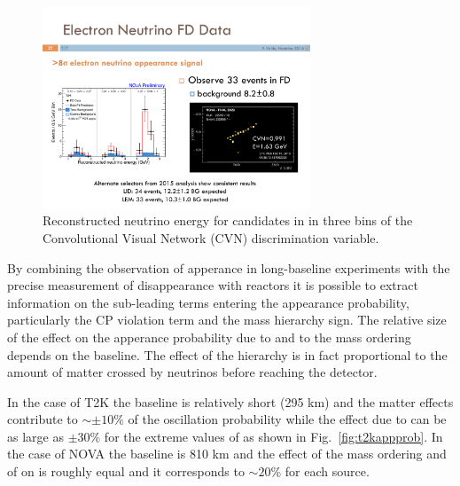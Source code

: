 \begin{figure} [h!]
\begin{center}
\includegraphics[width=8cm]{figures/nueapp_NOVA.pdf}
\caption{\label{fig:novaapp} Reconstructed neutrino energy for \nue candidates in \nova in three bins of the Convolutional Visual Network (CVN) discrimination variable.}
\end{center}
\end{figure}

By combining the observation of \nue apperance in long-baseline experiments with the precise measurement of \nueb disappearance with reactors it is possible to extract information on the sub-leading terms entering the appearance probability, particularly the CP violation term \dcp and the mass hierarchy sign. 
The relative size of the effect on the apperance probability due to \dcp and to the mass ordering depends on the baseline. The effect of the hierarchy is in fact proportional to the amount of matter crossed by neutrinos before reaching the detector. 

In the case of T2K the baseline is relatively short (295 km) and the matter effects contribute to $\sim\pm10\%$ of the oscillation probability while the effect due to \dcp can be as large as $\pm30\%$ for the extreme values of \dcp as shown in Fig.~\ref{fig:t2kappprob}. In the case of NOVA the baseline is 810 km and the effect of the mass ordering and of \dcp on \papp is roughly equal and it corresponds to $\sim20\%$ for each source.

